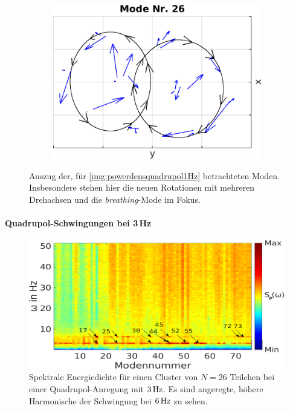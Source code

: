 \documentclass[numbers=noenddot,a4paper,notitlepage,twoside,BCOR15mm]{scrbook}
\newcommand{\tilt}[1]{\textit{#1}}
\begin{document}
\begin{figure}[!t]
								\begin{subfigure}[t]{0.325\textwidth}
									\centering
									\includegraphics[width=\textwidth,height=0.8\textwidth]{figs/auswertung/manipulation/quadrupol1HzModeNr26.png}
								\end{subfigure}
								\caption{Auszug der, für \autoref{img:powerdensquadrupol1Hz} betrachteten Moden. Insbesondere stehen hier die neuen Rotationen mit mehreren Drehachsen und die \tilt{breathing}-Mode im Fokus.}\label{img:modenquadrupol1Hz}
							\end{figure}


					\paragraph{Quadrupol-Schwingungen bei 3\,Hz}

							\begin{figure}[!b]
								\centering
								\includegraphics[width=\textwidth]{figs/auswertung/manipulation/quadrupol3Hzpowerdens.png}
								\caption{Spektrale Energiedichte für einen Cluster von $N=26$ Teilchen bei einer Quadrupol-Anregung mit $\unit[3]{Hz}$. Es sind angeregte, höhere Harmonische der Schwingung bei $\unit[6]{Hz}$ zu sehen.}\label{img:powerdensquadrupol3Hz}
							\end{figure}
\end{document}
